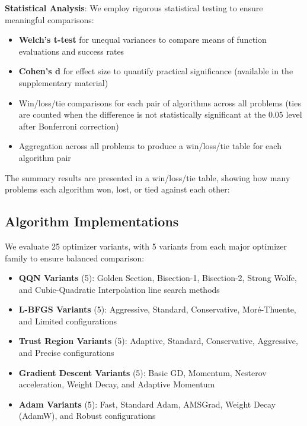 \textbf{Statistical Analysis}: We employ rigorous statistical testing to ensure meaningful comparisons:

\begin{itemize}
\tightlist
\item
  \textbf{Welch's t-test} for unequal variances to compare means of function evaluations and success rates
\item
  \textbf{Cohen's d} for effect size to quantify practical significance (available in the supplementary material)
\item
  Win/loss/tie comparisons for each pair of algorithms across all problems (ties are counted when the difference is not statistically significant at the 0.05 level after Bonferroni correction)
\item
  Aggregation across all problems to produce a win/loss/tie table for each algorithm pair
\end{itemize}

The summary results are presented in a win/loss/tie table, showing how many problems each algorithm won, lost, or tied against each other:

\begin{center}
{}
\end{center}

\hypertarget{algorithm-implementations}{%
\subsection{Algorithm Implementations}\label{algorithm-implementations}}

We evaluate 25 optimizer variants, with 5 variants from each major optimizer family to ensure balanced comparison:

\begin{itemize}
\tightlist
\item
  \textbf{QQN Variants} (5): Golden Section, Bisection-1, Bisection-2, Strong Wolfe, and Cubic-Quadratic Interpolation line search methods
\item
  \textbf{L-BFGS Variants} (5): Aggressive, Standard, Conservative, Moré-Thuente, and Limited configurations
\item
  \textbf{Trust Region Variants} (5): Adaptive, Standard, Conservative, Aggressive, and Precise configurations
\item
  \textbf{Gradient Descent Variants} (5): Basic GD, Momentum, Nesterov acceleration, Weight Decay, and Adaptive Momentum
\item
  \textbf{Adam Variants} (5): Fast, Standard Adam, AMSGrad, Weight Decay (AdamW), and Robust configurations
\end{itemize}

